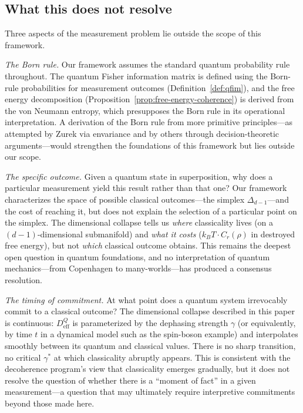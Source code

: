 \documentclass[12pt,a4paper]{article}
\theoremstyle{definition}
\theoremstyle{remark}
\begin{document}
\subsection{What this does not resolve}
\label{sec:not-resolves}

Three aspects of the measurement problem lie outside the scope of this framework.

\emph{The Born rule.} Our framework assumes the standard quantum probability rule throughout. The quantum Fisher information matrix is defined using the Born-rule probabilities for measurement outcomes (Definition~\ref{def:qfim}), and the free energy decomposition (Proposition~\ref{prop:free-energy-coherence}) is derived from the von Neumann entropy, which presupposes the Born rule in its operational interpretation. A derivation of the Born rule from more primitive principles---as attempted by Zurek \cite{zurek2003decoherence} via envariance and by others through decision-theoretic arguments---would strengthen the foundations of this framework but lies outside our scope.

\emph{The specific outcome.} Given a quantum state in superposition, why does a particular measurement yield this result rather than that one? Our framework characterizes the space of possible classical outcomes---the simplex $\Delta_{d-1}$---and the cost of reaching it, but does not explain the selection of a particular point on the simplex. The dimensional collapse tells us \emph{where} classicality lives (on a $(d-1)$-dimensional submanifold) and \emph{what it costs} ($k_BT \cdot C_r(\rho)$ in destroyed free energy), but not \emph{which} classical outcome obtains. This remains the deepest open question in quantum foundations, and no interpretation of quantum mechanics---from Copenhagen to many-worlds---has produced a consensus resolution.

\emph{The timing of commitment.} At what point does a quantum system irrevocably commit to a classical outcome? The dimensional collapse described in this paper is continuous: $D_{\mathrm{eff}}^Q$ is parameterized by the dephasing strength $\gamma$ (or equivalently, by time $t$ in a dynamical model such as the spin-boson example) and interpolates smoothly between its quantum and classical values. There is no sharp transition, no critical $\gamma^*$ at which classicality abruptly appears. This is consistent with the decoherence program's view that classicality emerges gradually, but it does not resolve the question of whether there is a ``moment of fact'' in a given measurement---a question that may ultimately require interpretive commitments beyond those made here.
\end{document}
